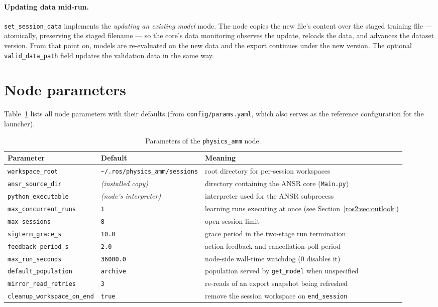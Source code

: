 \paragraph{Updating data mid-run.} \texttt{set\_session\_data} implements the
\emph{updating an existing model} mode. The node copies the new file's
content over the staged training file --- atomically, preserving the staged
filename --- so the core's data monitoring observes the update, reloads the
data, and advances the dataset version. From that point on, models are
re-evaluated on the new data and the export continues under the new version.
The optional \texttt{valid\_data\_path} field updates the validation data in
the same way.

\section{Node parameters}
\label{ros2:sec:parameters}

Table~\ref{ros2:tab:params} lists all node parameters with their defaults
(from \texttt{config/params.yaml}, which also serves as the reference
configuration for the launcher).

\begin{table}[tb]
  \centering
  \caption{Parameters of the \texttt{physics\_amm} node.}
  \label{ros2:tab:params}
  \footnotesize
  \begin{tabular}{@{}llp{6.4cm}@{}}
    \toprule
    Parameter & Default & Meaning \\
    \midrule
    \texttt{workspace\_root} & \texttt{\textasciitilde/.ros/physics\_amm/sessions} &
      root directory for per-session workspaces \\
    \texttt{ansr\_source\_dir} & \emph{(installed copy)} &
      directory containing the ANSR core (\texttt{Main.py}) \\
    \texttt{python\_executable} & \emph{(node's interpreter)} &
      interpreter used for the ANSR subprocess \\
    \texttt{max\_concurrent\_runs} & \texttt{1} &
      learning runs executing at once (see Section~\ref{ros2:sec:outlook}) \\
    \texttt{max\_sessions} & \texttt{8} & open-session limit \\
    \texttt{sigterm\_grace\_s} & \texttt{10.0} &
      grace period in the two-stage run termination \\
    \texttt{feedback\_period\_s} & \texttt{2.0} &
      action feedback and cancellation-poll period \\
    \texttt{max\_run\_seconds} & \texttt{36000.0} &
      node-side wall-time watchdog ($0$ disables it) \\
    \texttt{default\_population} & \texttt{archive} &
      population served by \texttt{get\_model} when unspecified \\
    \texttt{mirror\_read\_retries} & \texttt{3} &
      re-reads of an export snapshot being refreshed \\
    \texttt{cleanup\_workspace\_on\_end} & \texttt{true} &
      remove the session workspace on \texttt{end\_session} \\
    \bottomrule
  \end{tabular}
\end{table}


